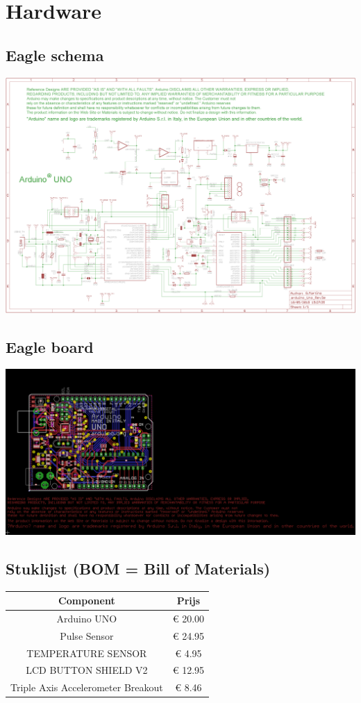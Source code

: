 \documentclass[a4paper]{report}
\begin{document}
\chapter{Hardware}
\section{Eagle schema}
\includegraphics[width=\textwidth]{ArduinoUno_Schema}

\section{Eagle board}
\includegraphics[width=\textwidth]{ArduinoUno_Board}

\section{Stuklijst (BOM = Bill of Materials)}
\begin{tabular}{|c|c|}
    \hline
    Component & Prijs\\
    \hline
    Arduino UNO                        & € 20.00\\
    Pulse Sensor                       & € 24.95\\
    TEMPERATURE SENSOR                 & €  4.95\\
    LCD BUTTON SHIELD V2               & € 12.95\\
    Triple Axis Accelerometer Breakout & €  8.46\\
    \hline
\end{tabular}
\end{document}
